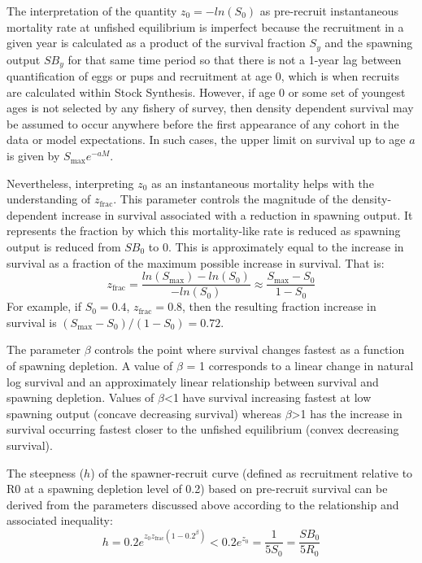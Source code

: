 The interpretation of the quantity $z_0=-ln(S_0)$ as pre-recruit instantaneous mortality rate at unfished equilibrium is imperfect because the recruitment in a given year is calculated as a product of the survival fraction $S_y$ and the spawning output $SB_y$ for that same time period so that there is not a 1-year lag between quantification of eggs or pups and recruitment at age 0, which is when recruits are calculated within Stock Synthesis. However, if age 0 or some set of youngest ages is not selected by any fishery of survey, then density dependent survival may be assumed to occur anywhere before the first appearance of any cohort in the data or model expectations. In such cases, the upper limit on survival up to age $a$ is given by $S_{\text{max}}e^{-aM}$. 

Nevertheless, interpreting $z_0$ as an instantaneous mortality helps with the understanding of $z_{\text{frac}}$. This parameter controls the magnitude of the density-dependent increase in survival associated with a reduction in spawning output. It represents the fraction by which this mortality-like rate is reduced as spawning output is reduced from $SB_0$ to 0. This is approximately equal to the increase in survival as a fraction of the maximum possible increase in survival. That is: 
\begin{equation}
z_{\text{frac}}=\frac{ln(S_{\text{max}})-ln(S_0)}{-ln(S_0)} \approx \frac{S_{\text{max}}-S_0}{1-S_0}
\end{equation}
For example, if $S_0 = 0.4$, $z_{\text{frac}}=0.8$, then the resulting fraction increase in survival is $(S_{\text{max}}-S_0)/(1-S_0)=0.72$.

The parameter $\beta$ controls the point where survival changes fastest as a function of spawning depletion. A value of $\beta$ = 1 corresponds to a linear change in natural log survival and an approximately linear relationship between survival and spawning depletion. Values of $\beta$<1 have survival increasing fastest at low spawning output (concave decreasing survival) whereas $\beta$>1 has the increase in survival occurring fastest closer to the unfished equilibrium (convex decreasing survival).  

The steepness ($h$) of the spawner-recruit curve (defined as recruitment relative to R0 at a spawning depletion level of 0.2) based on pre-recruit survival can be derived from the parameters discussed above according to the relationship and associated inequality:
\begin{equation}
h = 0.2e^{z_0z_{\text{frac}}(1-0.2^\beta)}<0.2e^{z_0}=\frac{1}{5S_0}=\frac{SB_0}{5R_0}
\end{equation}

